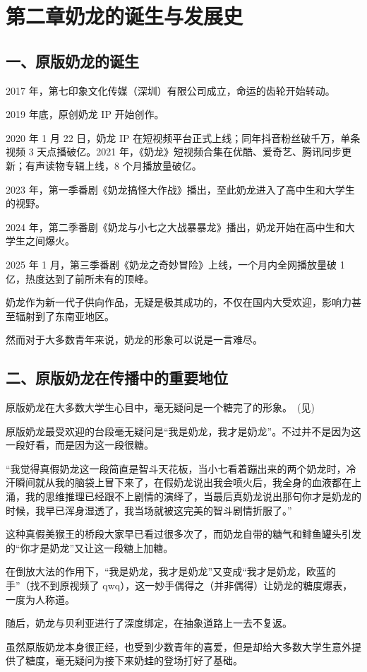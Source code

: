 
\clearpage
\section{第二章\quad 奶龙的诞生与发展史}

\subsection{一、原版奶龙的诞生}

2017 年，第七印象文化传媒（深圳）有限公司成立，命运的齿轮开始转动。

2019 年底，原创奶龙 IP 开始创作。

2020 年 1 月 22 日，奶龙 IP 在短视频平台正式上线；同年抖音粉丝破千万，单条视频 3 天点播破亿。2021 年，《奶龙》短视频合集在优酷、爱奇艺、腾讯同步更新；有声读物专辑上线，8 个月播放量破亿。

2023 年，第一季番剧《奶龙搞怪大作战》播出，至此奶龙进入了高中生和大学生的视野。

2024 年，第二季番剧《奶龙与小七之大战暴暴龙》播出，奶龙开始在高中生和大学生之间爆火。

2025 年 1 月，第三季番剧《奶龙之奇妙冒险》上线，一个月内全网播放量破 1 亿，热度达到了前所未有的顶峰。

奶龙作为新一代子供向作品，无疑是极其成功的，不仅在国内大受欢迎，影响力甚至辐射到了东南亚地区。

然而对于大多数青年来说，奶龙的形象可以说是一言难尽。

\subsection{二、原版奶龙在传播中的重要地位}

原版奶龙在大多数大学生心目中，毫无疑问是一个糖完了的形象。~(见)



原版奶龙最受欢迎的台段毫无疑问是“我是奶龙，我才是奶龙”。不过并不是因为这一段好看，而是因为这一段很糖。

“我觉得真假奶龙这一段简直是智斗天花板，当小七看着蹦出来的两个奶龙时，冷汗瞬间就从我的脑袋上冒下来了，在假奶龙说出我会喷火后，我全身的血液都在上涌，我的思维推理已经跟不上剧情的演绎了，当最后真奶龙说出那句你才是奶龙的时候，我早已浑身湿透了，我当场就被这完美的智斗剧情折服了。”

这种真假美猴王的桥段大家早已看过很多次了，而奶龙自带的糖气和鲱鱼罐头引发的“你才是奶龙”又让这一段糖上加糖。

在倒放大法的作用下，“我是奶龙，我才是奶龙”又变成“我才是奶龙，欧蓝的手”（找不到原视频了 qwq），这一妙手偶得之（并非偶得）让奶龙的糖度爆表，一度为人称道。

随后，奶龙与贝利亚进行了深度绑定，在抽象道路上一去不复返。

虽然原版奶龙本身很正经，也受到少数青年的喜爱，但是却给大多数大学生意外提供了糖度，毫无疑问为接下来奶蛙的登场打好了基础。

